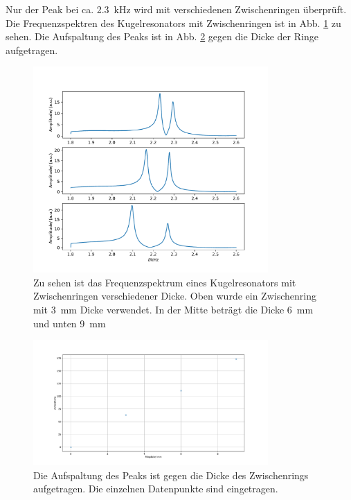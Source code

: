 Nur der Peak bei ca. \SI{2.3}{\kilo\hertz} wird mit verschiedenen Zwischenringen überprüft. Die Frequenzspektren des Kugelresonators mit Zwischenringen ist in Abb. \ref{fig:zwischenringe} zu sehen.
Die Aufspaltung des Peaks ist in Abb. \ref{fig:aufspaltung} gegen die Dicke der Ringe aufgetragen.

\begin{figure}
    \centering
    \includegraphics[width=0.8\textwidth]{plots/C_4.pdf}
    \caption{Zu sehen ist das Frequenzspektrum eines Kugelresonators mit Zwischenringen verschiedener Dicke. Oben wurde ein Zwischenring mit \SI{3}{\milli\metre} Dicke verwendet. In der Mitte beträgt die Dicke \SI{6}{\milli\metre} und unten \SI{9}{\milli\metre}}
    \label{fig:zwischenringe}
\end{figure}

\begin{figure}
    \centering
    \includegraphics[width=0.8\textwidth]{plots/C_Aufspaltung.pdf}
    \caption{Die Aufspaltung des Peaks ist gegen die Dicke des Zwischenrings aufgetragen. Die einzelnen Datenpunkte sind eingetragen.}
    \label{fig:aufspaltung}
\end{figure}

